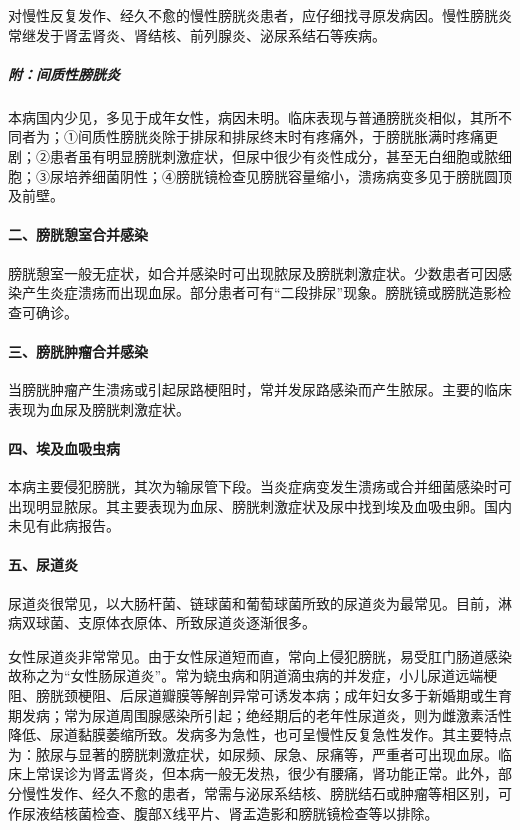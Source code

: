 对慢性反复发作、经久不愈的慢性膀胱炎患者，应仔细找寻原发病因。慢性膀胱炎常继发于肾盂肾炎、肾结核、前列腺炎、泌尿系结石等疾病。

\subparagraph{附：间质性膀胱炎}

本病国内少见，多见于成年女性，病因未明。临床表现与普通膀胱炎相似，其所不同者为；①间质性膀胱炎除于排尿和排尿终末时有疼痛外，于膀胱胀满时疼痛更剧；②患者虽有明显膀胱刺激症状，但尿中很少有炎性成分，甚至无白细胞或脓细胞；③尿培养细菌阴性；④膀胱镜检查见膀胱容量缩小，溃疡病变多见于膀胱圆顶及前壁。

\paragraph{二、膀胱憩室合并感染}

膀胱憩室一般无症状，如合并感染时可出现脓尿及膀胱刺激症状。少数患者可因感染产生炎症溃疡而出现血尿。部分患者可有“二段排尿”现象。膀胱镜或膀胱造影检查可确诊。

\paragraph{三、膀胱肿瘤合并感染}

当膀胱肿瘤产生溃疡或引起尿路梗阻时，常并发尿路感染而产生脓尿。主要的临床表现为血尿及膀胱刺激症状。

\paragraph{四、埃及血吸虫病}

本病主要侵犯膀胱，其次为输尿管下段。当炎症病变发生溃疡或合并细菌感染时可出现明显脓尿。其主要表现为血尿、膀胱刺激症状及尿中找到埃及血吸虫卵。国内未见有此病报告。

\paragraph{五、尿道炎}

尿道炎很常见，以大肠杆菌、链球菌和葡萄球菌所致的尿道炎为最常见。目前，淋病双球菌、支原体衣原体、所致尿道炎逐渐很多。

女性尿道炎非常常见。由于女性尿道短而直，常向上侵犯膀胱，易受肛门肠道感染故称之为“女性肠尿道炎”。常为蛲虫病和阴道滴虫病的并发症，小儿尿道远端梗阻、膀胱颈梗阻、后尿道瓣膜等解剖异常可诱发本病；成年妇女多于新婚期或生育期发病；常为尿道周围腺感染所引起；绝经期后的老年性尿道炎，则为雌激素活性降低、尿道黏膜萎缩所致。发病多为急性，也可呈慢性反复急性发作。其主要特点为：脓尿与显著的膀胱刺激症状，如尿频、尿急、尿痛等，严重者可出现血尿。临床上常误诊为肾盂肾炎，但本病一般无发热，很少有腰痛，肾功能正常。此外，部分慢性发作、经久不愈的患者，常需与泌尿系结核、膀胱结石或肿瘤等相区别，可作尿液结核菌检查、腹部X线平片、肾盂造影和膀胱镜检查等以排除。

